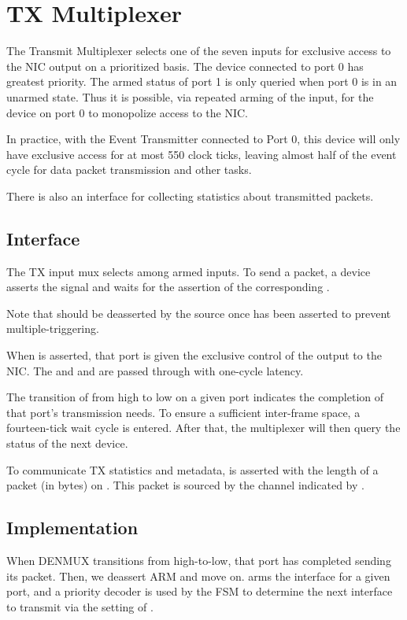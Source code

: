 
\section{TX Multiplexer}
The Transmit Multiplexer selects one of the seven inputs for exclusive
access to the NIC output on a prioritized basis. The device connected
to port 0 has greatest priority. The armed status of port 1 is only
queried when port 0 is in an unarmed state. Thus it is possible, via
repeated arming of the input, for the device on port 0 to monopolize
access to the NIC.

In practice, with the Event Transmitter connected to Port 0, this
device will only have exclusive access for at most 550 clock ticks,
leaving almost half of the event cycle for data packet transmission
and other tasks.

There is also an interface for collecting statistics about transmitted
packets.

\subsection{Interface}
The TX input mux selects among armed inputs. To send a packet, a
device asserts the  signal and waits for the assertion of
the corresponding .

Note that  should be deasserted by the source once
 has been asserted to prevent multiple-triggering.

When  is asserted, that port is given the exclusive
control of the output to the NIC. The  and and
 are passed through with one-cycle latency.

The transition of  from high to low on a given port
indicates the completion of that port's transmission needs. To ensure
a sufficient inter-frame space, a fourteen-tick wait cycle is entered.
After that, the multiplexer will then query the  status of
the next device.

To communicate TX statistics and metadata,  is
asserted with the length of a packet (in bytes) on
. This packet is sourced by the channel indicated
by .

\subsection{Implementation}

When DENMUX transitions from high-to-low, that port has completed
sending its packet. Then, we deassert ARM and move on. 
arms the interface for a given port, and a priority decoder is used by
the FSM to determine the next interface to transmit via the setting of
.

